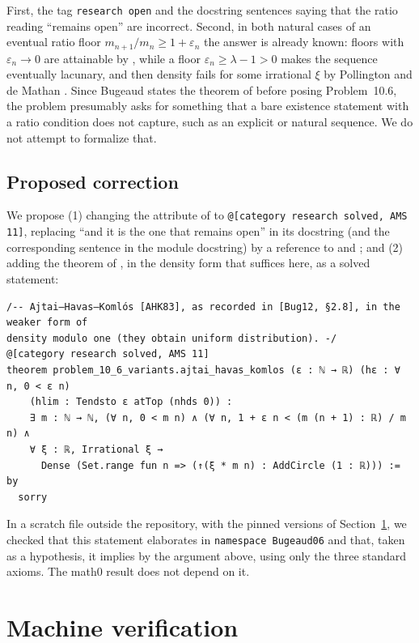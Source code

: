 \documentclass[11pt]{amsart}
\theoremstyle{plain}
\theoremstyle{definition}
\begin{document}
First, the tag \texttt{research open} and the docstring sentences saying that the ratio reading ``remains open'' are incorrect. Second, in both natural cases of an eventual ratio floor $m_{n+1}/m_n\ge1+\varepsilon_n$ the answer is already known: floors with $\varepsilon_n\to0$ are attainable by \cite{AHK83}, while a floor $\varepsilon_n\ge\lambda-1>0$ makes the sequence eventually lacunary, and then density fails for some irrational $\xi$ by Pollington and de Mathan \cite{Pol79,Mat80}. Since Bugeaud states the theorem of \cite{AHK83} before posing Problem~10.6, the problem presumably asks for something that a bare existence statement with a ratio condition does not capture, such as an explicit or natural sequence. We do not attempt to formalize that.

\subsection*{Proposed correction}
We propose (1) changing the attribute of  to \texttt{@[category research solved, AMS 11]}, replacing ``and it is the one that remains open'' in its docstring (and the corresponding sentence in the module docstring) by a reference to \cite{AHK83} and \cite[\S2.8]{Bug12}; and (2) adding the theorem of \cite{AHK83}, in the density form that suffices here, as a solved statement:
\begin{lstlisting}
/-- Ajtai–Havas–Komlós [AHK83], as recorded in [Bug12, §2.8], in the weaker form of
density modulo one (they obtain uniform distribution). -/
@[category research solved, AMS 11]
theorem problem_10_6_variants.ajtai_havas_komlos (ε : ℕ → ℝ) (hε : ∀ n, 0 < ε n)
    (hlim : Tendsto ε atTop (nhds 0)) :
    ∃ m : ℕ → ℕ, (∀ n, 0 < m n) ∧ (∀ n, 1 + ε n < (m (n + 1) : ℝ) / m n) ∧
    ∀ ξ : ℝ, Irrational ξ →
      Dense (Set.range fun n => (↑(ξ * m n) : AddCircle (1 : ℝ))) := by
  sorry
\end{lstlisting}
In a scratch file outside the repository, with the pinned versions of Section~\ref{sec:lean}, we checked that this statement elaborates in \texttt{namespace Bugeaud06} and that, taken as a hypothesis, it implies  by the argument above, using only the three standard axioms. The math0 result does not depend on it.

\section{Machine verification}\label{sec:lean}
\end{document}
